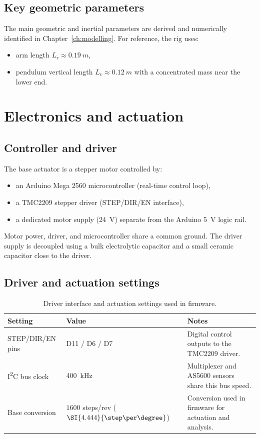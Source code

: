 \subsection*{Key geometric parameters}
The main geometric and inertial parameters are derived and numerically identified in Chapter~\ref{ch:modelling}. For reference, the rig uses:
\begin{itemize}
  \item arm length $L_r \approx \SI{0.19}{m}$,
  \item pendulum vertical length $L_v \approx \SI{0.12}{m}$ with a concentrated mass near the lower end.
\end{itemize}

\section{Electronics and actuation}
\label{sec:electronics_actuation}
\subsection*{Controller and driver}
The base actuator is a stepper motor controlled by:
\begin{itemize}
  \item an Arduino Mega 2560 microcontroller (real-time control loop),
  \item a TMC2209 stepper driver (STEP/DIR/EN interface),
  \item a dedicated motor supply (\SI{24}{V}) separate from the Arduino \SI{5}{V} logic rail.
\end{itemize}
Motor power, driver, and microcontroller share a common ground. The driver supply is decoupled using a bulk electrolytic capacitor and a small ceramic capacitor close to the driver.

\subsection*{Driver and actuation settings}
\begin{table}[htbp]
  \centering
  \small
  \setlength{\tabcolsep}{6pt}
  \caption{Driver interface and actuation settings used in firmware.}
  \label{tab:driver_actuation_settings}
  \begin{tabularx}{\linewidth}{@{}l l X@{}}
    \toprule
    Setting & Value & Notes \\
    \midrule
    STEP/DIR/EN pins & D11 / D6 / D7 & Digital control outputs to the TMC2209 driver. \\
    I\textsuperscript{2}C bus clock & \SI{400}{kHz} & Multiplexer and AS5600 sensors share this bus speed. \\
    Base conversion & $1600$ steps/rev ($\SI{4.444}{\step\per\degree}$) & Conversion used in firmware for actuation and analysis. \\
    \bottomrule
  \end{tabularx}
\end{table}

